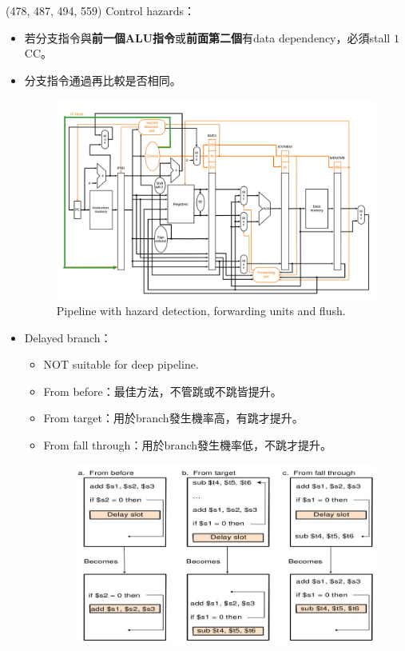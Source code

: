 \item \begin{theorem}{(478, 487, 494, 559)} Control hazards：\begin{itemize}
        \item 若分支指令與\textbf{前一個ALU指令}或\textbf{前面第二個}有data dependency，必須stall $1$ CC。
        \item 分支指令通過再比較是否相同。
        \begin{figure}[H]
            \centering
            \includegraphics[scale=0.3]{img/pipeline-flush.png}
            \caption{Pipeline with hazard detection, forwarding units and flush.}
            \label{img:pipeline-flush}
        \end{figure}
        \item Delayed branch：\begin{itemize}
            \item NOT suitable for deep pipeline.
            \item From before：最佳方法，不管跳或不跳皆提升。
            \item From target：用於branch發生機率高，有跳才提升。
            \item From fall through：用於branch發生機率低，不跳才提升。
            \begin{figure}[H]
                \centering
                \includegraphics[scale=0.6]{img/delayed-branch.jpg}

\end{figure}
\end{itemize}
\end{itemize}
\end{theorem}
